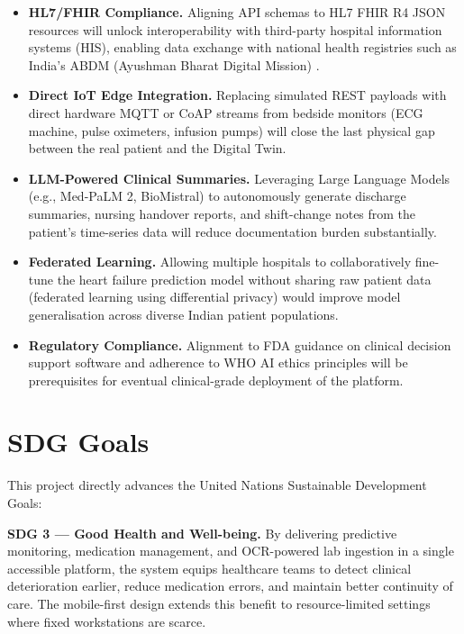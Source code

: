 \documentclass[12pt,a4paper]{article}
\begin{document}
\begin{itemize}[leftmargin=*, itemsep=4pt]
  \item \textbf{HL7/FHIR Compliance.}  Aligning API schemas to HL7 FHIR R4 JSON resources \cite{hl7fhir} will unlock interoperability with third-party hospital information systems (HIS), enabling data exchange with national health registries such as India's ABDM (Ayushman Bharat Digital Mission) \cite{abdm2021}.
  \item \textbf{Direct IoT Edge Integration.}  Replacing simulated REST payloads with
        direct hardware MQTT or CoAP streams from bedside monitors (ECG machine,
        pulse oximeters, infusion pumps) will close the last physical gap between the
        real patient and the Digital Twin.
  \item \textbf{LLM-Powered Clinical Summaries.}  Leveraging Large Language Models
        (e.g., Med-PaLM 2, BioMistral) to autonomously generate discharge summaries,
        nursing handover reports, and shift-change notes from the patient's time-series
        data will reduce documentation burden substantially.
  \item \textbf{Federated Learning.}  Allowing multiple hospitals to collaboratively
        fine-tune the heart failure prediction model without sharing raw patient data
        (federated learning using differential privacy) would improve model
        generalisation across diverse Indian patient populations.
  \item \textbf{Regulatory Compliance.}  Alignment to FDA guidance \cite{usfda2022} on clinical decision support software and adherence to WHO AI ethics principles \cite{who2021} will be prerequisites for eventual clinical-grade deployment of the platform.
\end{itemize}

\section{SDG Goals}

This project directly advances the United Nations Sustainable Development Goals:

\textbf{SDG 3 — Good Health and Well-being.}  By delivering predictive monitoring,
medication management, and OCR-powered lab ingestion in a single accessible platform,
the system equips healthcare teams to detect clinical deterioration earlier, reduce
medication errors, and maintain better continuity of care. The mobile-first design
extends this benefit to resource-limited settings where fixed workstations are scarce.
\end{document}
